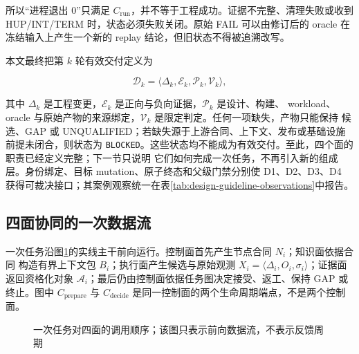 \documentclass[UTF8,a4paper,zihao=-4,oneside]{ctexart}
\newcommand{\statusword}[1]{\texttt{#1}}
\begin{document}
所以“进程退出 0”只满足 $C_{\mathrm{run}}$，并不等于工程成功。证据不完整、清理失败或收到
HUP/INT/TERM 时，状态必须失败关闭。原始 FAIL 可以由修订后的 oracle 在冻结输入上产生一个新的
replay 结论，但旧状态不得被追溯改写。

本文最终把第 $k$ 轮有效交付定义为

\[
\mathcal{D}_k=\langle\Delta_k,\mathcal{E}_k,\mathcal{P}_k,\mathcal{V}_k\rangle,
\]

其中 $\Delta_k$ 是工程变更，$\mathcal{E}_k$ 是正向与负向证据，$\mathcal{P}_k$ 是设计、构建、
workload、oracle 与原始产物的来源绑定，$\mathcal{V}_k$ 是限定判定。任何一项缺失，产物只能保持
候选、GAP 或 UNQUALIFIED；若缺失源于上游合同、上下文、发布或基础设施前提未闭合，则状态为
\statusword{BLOCKED}。这些状态均不能成为有效交付。至此，四个面的职责已经定义完整；下一节只说明
它们如何完成一次任务，不再引入新的组成层。身份绑定、目标 mutation、原子终态和父级门禁分别使
D1、D2、D3、D4 获得可裁决接口；其案例观察统一在表\ref{tab:design-guideline-observations}中报告。

\subsection{四面协同的一次数据流}

一次任务沿图\ref{fig:dataflow}的实线主干前向运行。控制面首先产生节点合同 $N_i$；知识面依据合同
构造有界上下文包 $B_i$；执行面产生候选与原始观测 $X_i=\langle\Delta_i,O_i,\sigma_i\rangle$；证据面
返回资格化对象 $\mathcal{A}_i$；最后仍由控制面依据任务图决定接受、返工、保持 GAP 或终止。图中
$C_{\mathrm{prepare}}$ 与 $C_{\mathrm{decide}}$ 是同一控制面的两个生命周期端点，不是两个控制面。

\begin{figure}[htbp]
  \centering
  \caption{一次任务对四面的调用顺序；该图只表示前向数据流，不表示反馈周期}
  \label{fig:dataflow}
\end{figure}
\end{document}
